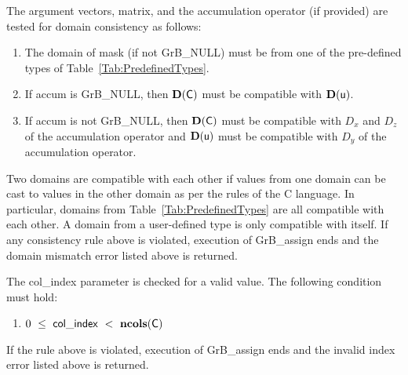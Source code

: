 The argument vectors, matrix, and the accumulation 
operator (if provided) are tested for domain consistency as follows:
\begin{enumerate}
	\item The domain of {\sf mask} (if not {\sf GrB\_NULL}) must be from one of 
    the pre-defined types of Table~\ref{Tab:PredefinedTypes}.

	\item If {\sf accum} is {\sf GrB\_NULL}, then $\bold{D}({\sf C})$ must be 
    compatible with $\bold{D}({\sf u})$.

	\item If {\sf accum} is not {\sf GrB\_NULL}, then $\bold{D}({\sf C})$ must be
    compatible with $D_x$ and $D_z$ of the accumulation operator and 
    $\bold{D}({\sf u})$ must be compatible with $D_y$ of the accumulation operator.
\end{enumerate}
Two domains are compatible with each other if values from one domain can be cast 
to values in the other domain as per the rules of the C language.
In particular, domains from Table~\ref{Tab:PredefinedTypes} are all compatible 
with each other. A domain from a user-defined type is only compatible with itself.
If any consistency rule above is violated, execution of {\sf GrB\_assign} ends
and the domain mismatch error listed above is returned.

The {\sf col\_index} parameter is checked for a valid value.  The following
condition must hold:
\begin{enumerate}
	\item $0\ \leq\ {\sf col\_index} \ <\ \bold{ncols}({\sf C})$
\end{enumerate}
If the rule above is violated, execution of {\sf GrB\_assign} ends 
and the invalid index error listed above is returned.

